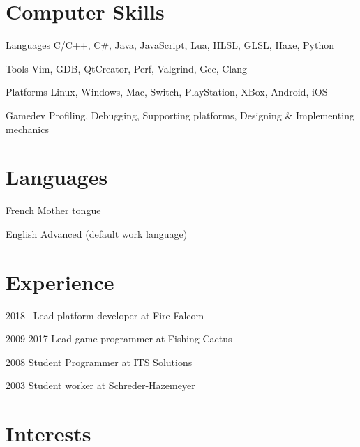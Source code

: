 \documentclass[11pt,letterpaper]{report}
\begin{document}
    \section*{Computer Skills}

    \begin{tablist}

        \item[Languages] \tab{}C/C++, C\#, Java, JavaScript, Lua, HLSL, GLSL, Haxe, Python
        \item[Tools] \tab{}Vim, GDB, QtCreator, Perf, Valgrind, Gcc, Clang
        \item[Platforms] \tab{}Linux, Windows, Mac, Switch, PlayStation, XBox, Android, iOS
        \item[Gamedev] \tab{}Profiling, Debugging, Supporting platforms, Designing \& Implementing mechanics

    \end{tablist}

    \section*{Languages}

    \begin{tablist}

        \item[French] \tab{}Mother tongue
        \item[English] \tab{}Advanced (default work language)

    \end{tablist}

    \section*{Experience}

    \begin{tablist}

        \item[2018--]        \tab{}Lead platform developer at Fire Falcom
        \item[2009-2017]        \tab{}Lead game programmer at Fishing Cactus
        \item[2008]        \tab{}Student Programmer at ITS Solutions
        \item[2003]        \tab{}Student worker at Schreder-Hazemeyer

    \end{tablist}

    \section*{Interests}
\end{document}
